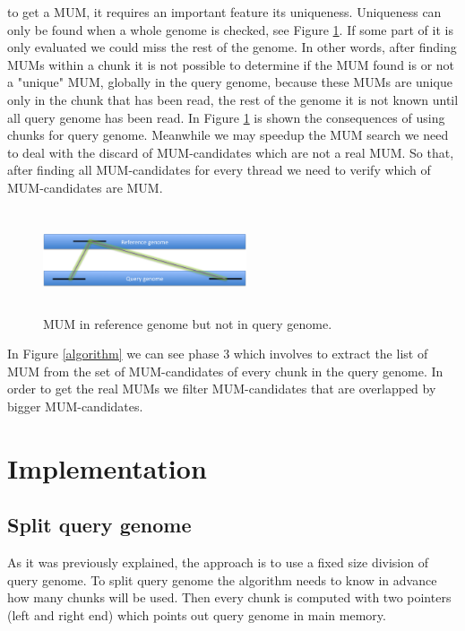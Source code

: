 \documentclass[3p,times]{elsarticle}
\begin{document}
to get a MUM, it requires an important feature its uniqueness. 
Uniqueness can only be found when a whole genome is checked, see Figure \ref{Whole-MUM}. If some part of it is only evaluated we could miss the rest of the genome. In other words, after finding MUMs within a chunk it is not possible to determine if the MUM found is or not a "unique" MUM, globally in the query genome,  because these MUMs are unique only in the chunk that has been read, the rest of the genome it is not known until all query genome has been read. In Figure \ref{Whole-MUM} is shown the consequences of using chunks for query genome. Meanwhile we may speedup the MUM search we need to deal with the discard of MUM-candidates which are not a real MUM. So that, after finding all MUM-candidates for every thread we need to verify which of MUM-candidates are MUM.\\
\begin{figure}[htb]  
\begin{center} 
  \includegraphics[width=6cm,height=3cm]{Whole-MUM.png}
\end{center} 
\caption{MUM in reference genome but not in query genome.} 
\label{Whole-MUM} 
\end{figure}
In Figure \ref{algorithm} we can see phase 3 which involves to extract the list of MUM from the set of MUM-candidates of every chunk in the query genome. In order to get the real MUMs we filter MUM-candidates that are overlapped by bigger MUM-candidates.\\
\section{Implementation} 
\label{implementation}
\subsection*{Split query genome}  
As it was previously explained, the approach is to use a fixed size division of query genome. To split query genome the algorithm needs to know in advance how many chunks will be used. Then every chunk is computed with two pointers (left and right end) which points out query genome in main memory.
\end{document}
